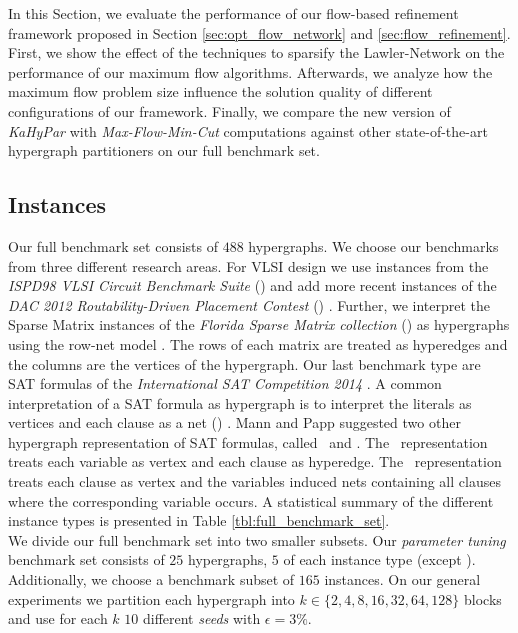 In this Section, we evaluate the performance of our flow-based refinement framework proposed
in Section \ref{sec:opt_flow_network} and \ref{sec:flow_refinement}. First, we show the
effect of the techniques to sparsify the Lawler-Network \cite{lawler1973} on the
performance of our maximum flow algorithms. Afterwards, we analyze how the maximum
flow problem size influence the solution quality of different configurations of
our framework. Finally, we compare the new version of \emph{KaHyPar} with
\emph{Max-Flow-Min-Cut} computations against other
state-of-the-art hypergraph partitioners on our full benchmark set.


\subsection{Instances}

Our full benchmark set consists of $488$ hypergraphs. We choose our benchmarks 
from three different research areas. For VLSI design we use instances from
the \emph{ISPD98 VLSI Circuit Benchmark Suite} (\ISPD) \cite{alpert1998ispd98} and add more recent
instances of the \emph{DAC 2012 Routability-Driven Placement Contest} (\DAC) \cite{viswanathan2012dac}.
Further, we interpret the Sparse Matrix instances of the \emph{Florida Sparse Matrix 
collection} (\SPM) \cite{davis2011university} as hypergraphs using the row-net model \cite{catalyurek1999hypergraph}.
The rows of each matrix are treated as hyperedges and the columns are the vertices of
the hypergraph. Our last benchmark type are SAT formulas of the \emph{International SAT
Competition 2014} \cite{belov2014application}. A common interpretation of a SAT formula 
as hypergraph is to interpret the literals as vertices and each clause as a net (\Literal) \cite{papa2007hypergraph}.
Mann and Papp \cite{mann2014formula} suggested two other hypergraph representation of
SAT formulas, called \Primal~and \Dual. The \Primal~representation treats each variable
as vertex and each clause as hyperedge. The \Dual~representation treats each clause as
vertex and the variables induced nets containing all clauses where the corresponding
variable occurs. A statistical summary of the different instance types is presented in
Table \ref{tbl:full_benchmark_set}. \\
We divide our full benchmark set into two smaller subsets. Our \emph{parameter tuning}
benchmark set consists of $25$ hypergraphs, $5$ of each instance type (except \DAC). Additionally,
we choose a benchmark subset of $165$ instances. On our general experiments we partition
each hypergraph into $k \in \{2,4,8,16,32,64,128\}$ blocks and use for each $k$ $10$ different
\emph{seeds} with $\epsilon = 3\%$.


